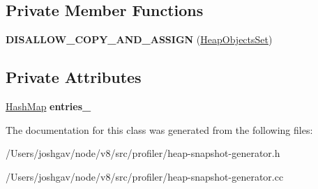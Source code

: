 \subsection*{Private Member Functions}
\begin{DoxyCompactItemize}
\item 
{\bfseries D\+I\+S\+A\+L\+L\+O\+W\+\_\+\+C\+O\+P\+Y\+\_\+\+A\+N\+D\+\_\+\+A\+S\+S\+I\+GN} (\hyperlink{classv8_1_1internal_1_1_heap_objects_set}{Heap\+Objects\+Set})\hypertarget{classv8_1_1internal_1_1_heap_objects_set_a8d0d8c0e0d7343a91b8b4787c2baae38}{}\label{classv8_1_1internal_1_1_heap_objects_set_a8d0d8c0e0d7343a91b8b4787c2baae38}

\end{DoxyCompactItemize}
\subsection*{Private Attributes}
\begin{DoxyCompactItemize}
\item 
\hyperlink{classv8_1_1internal_1_1_template_hash_map_impl}{Hash\+Map} {\bfseries entries\+\_\+}\hypertarget{classv8_1_1internal_1_1_heap_objects_set_a5d9a82a5a6a929db1fc5d7c1234b5c0f}{}\label{classv8_1_1internal_1_1_heap_objects_set_a5d9a82a5a6a929db1fc5d7c1234b5c0f}

\end{DoxyCompactItemize}


The documentation for this class was generated from the following files\+:\begin{DoxyCompactItemize}
\item 
/\+Users/joshgav/node/v8/src/profiler/heap-\/snapshot-\/generator.\+h\item 
/\+Users/joshgav/node/v8/src/profiler/heap-\/snapshot-\/generator.\+cc\end{DoxyCompactItemize}

